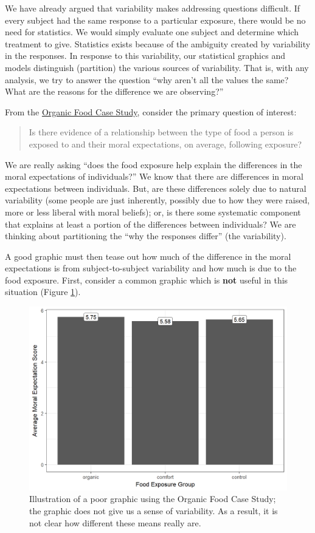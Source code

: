 \documentclass[]{book}
\theoremstyle{plain}
\theoremstyle{mydefn}
\theoremstyle{myexmpl}
\theoremstyle{remark}
\begin{document}
We have already argued that variability makes addressing questions
difficult. If every subject had the same response to a particular
exposure, there would be no need for statistics. We would simply
evaluate one subject and determine which treatment to give. Statistics
exists because of the ambiguity created by variability in the responses.
In response to this variability, our statistical graphics and models
distinguish (partition) the various sources of variability. That is,
with any analysis, we try to answer the question ``why aren't all the
values the same? What are the reasons for the difference we are
observing?''

From the \protect\hyperlink{CaseOrganic}{Organic Food Case Study},
consider the primary question of interest:

\begin{quote}
Is there evidence of a relationship between the type of food a person is
exposed to and their moral expectations, on average, following exposure?
\end{quote}

We are really asking ``does the food exposure help explain the
differences in the moral expectations of individuals?'' We know that
there are differences in moral expectations between individuals. But,
are these differences solely due to natural variability (some people are
just inherently, possibly due to how they were raised, more or less
liberal with moral beliefs); or, is there some systematic component that
explains at least a portion of the differences between individuals? We
are thinking about partitioning the ``why the responses differ'' (the
variability).

A good graphic must then tease out how much of the difference in the
moral expectations is from subject-to-subject variability and how much
is due to the food exposure. First, consider a common graphic which is
\textbf{not} useful in this situation (Figure
\ref{fig:anovasummaries-bad-bar}).

\begin{figure}

{\centering \includegraphics[width=0.8\linewidth]{./Images/anovasummaries-bad-bar-1} 

}

\caption{Illustration of a poor graphic using the Organic Food Case Study; the graphic does not give us a sense of variability.  As a result, it is not clear how different these means really are.}\label{fig:anovasummaries-bad-bar}
\end{figure}
\end{document}
